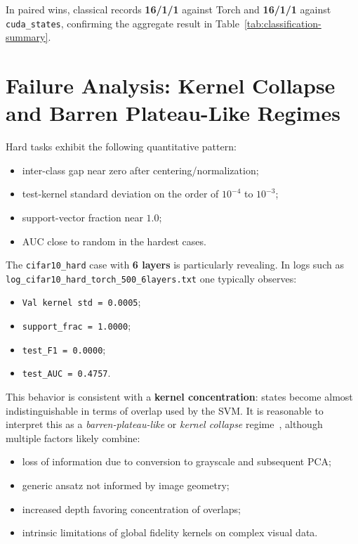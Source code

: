 \documentclass[10pt,twocolumn,letterpaper]{article}
\begin{document}
In paired wins, classical records \textbf{16/1/1} against Torch and \textbf{16/1/1} against \texttt{cuda\_states}, confirming the aggregate result in Table~\ref{tab:classification-summary}.

\section{Failure Analysis: Kernel Collapse and Barren Plateau-Like Regimes}
Hard tasks exhibit the following quantitative pattern:
\begin{itemize}
    \item inter-class gap near zero after centering/normalization;
    \item test-kernel standard deviation on the order of $10^{-4}$ to $10^{-3}$;
    \item support-vector fraction near $1.0$;
    \item AUC close to random in the hardest cases.
\end{itemize}

The \texttt{cifar10\_hard} case with \textbf{6 layers} is particularly revealing. In logs such as \texttt{log\_cifar10\_hard\_torch\_500\_6layers.txt} one typically observes:
\begin{itemize}
    \item \texttt{Val kernel std = 0.0005};
    \item \texttt{support\_frac = 1.0000};
    \item \texttt{test\_F1 = 0.0000};
    \item \texttt{test\_AUC = 0.4757}.
\end{itemize}

This behavior is consistent with a \textbf{kernel concentration}: states become almost indistinguishable in terms of overlap used by the SVM. It is reasonable to interpret this as a \emph{barren-plateau-like} or \emph{kernel collapse} regime~\cite{larocca2024review,thanasilp2022exponential}, although multiple factors likely combine:
\begin{itemize}
    \item loss of information due to conversion to grayscale and subsequent PCA;
    \item generic ansatz not informed by image geometry;
    \item increased depth favoring concentration of overlaps;
    \item intrinsic limitations of global fidelity kernels on complex visual data.
\end{itemize}
\end{document}
